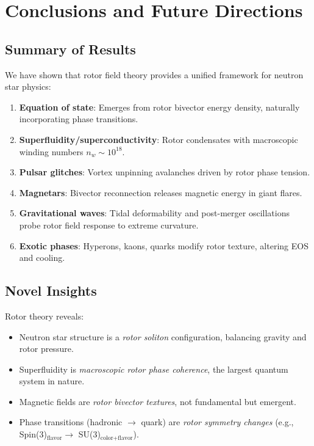\documentclass[12pt,a4paper]{article}
\theoremstyle{definition}
\theoremstyle{remark}
\begin{document}
\section{Conclusions and Future Directions}

\subsection{Summary of Results}

We have shown that rotor field theory provides a unified framework for neutron star physics:

\begin{enumerate}
\item \textbf{Equation of state}: Emerges from rotor bivector energy density, naturally incorporating phase transitions.
\item \textbf{Superfluidity/superconductivity}: Rotor condensates with macroscopic winding numbers $n_w \sim 10^{18}$.
\item \textbf{Pulsar glitches}: Vortex unpinning avalanches driven by rotor phase tension.
\item \textbf{Magnetars}: Bivector reconnection releases magnetic energy in giant flares.
\item \textbf{Gravitational waves}: Tidal deformability and post-merger oscillations probe rotor field response to extreme curvature.
\item \textbf{Exotic phases}: Hyperons, kaons, quarks modify rotor texture, altering EOS and cooling.
\end{enumerate}

\subsection{Novel Insights}

Rotor theory reveals:
\begin{itemize}
\item Neutron star structure is a \emph{rotor soliton} configuration, balancing gravity and rotor pressure.
\item Superfluidity is \emph{macroscopic rotor phase coherence}, the largest quantum system in nature.
\item Magnetic fields are \emph{rotor bivector textures}, not fundamental but emergent.
\item Phase transitions (hadronic $\to$ quark) are \emph{rotor symmetry changes} (e.g., Spin(3)$_{\text{flavor}} \to$ SU(3)$_{\text{color+flavor}}$).
\end{itemize}
\end{document}
